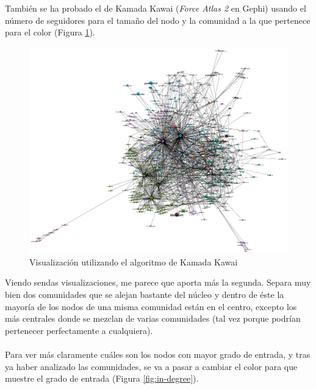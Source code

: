 También se ha probado el de Kamada Kawai (\textit{Force Atlas 2} en Gephi) usando el número de seguidores para el tamaño del nodo y la comunidad a la que pertenece para el color (Figura \ref{fig:kamada-kawai}).
	
\begin{figure}[H]
	\centering
	\includegraphics[width=14cm]{img/kamada-kawai}
	\caption{Visualización utilizando el algoritmo de Kamada Kawai}
	\label{fig:kamada-kawai}
\end{figure}

Viendo sendas visualizaciones, me parece que aporta más la segunda. Separa muy bien dos comunidades que se alejan bastante del núcleo y dentro de éste la mayoría de los nodos de una misma comunidad están en el centro, excepto los más centrales donde se mezclan de varias comunidades (tal vez porque podrían pertenecer perfectamente a cualquiera).
\\ \\
Para ver más claramente cuáles son los nodos con mayor grado de entrada, y tras ya haber analizado las comunidades, se va a pasar a cambiar el color para que muestre el grado de entrada (Figura \ref{fig:in-degree}).


